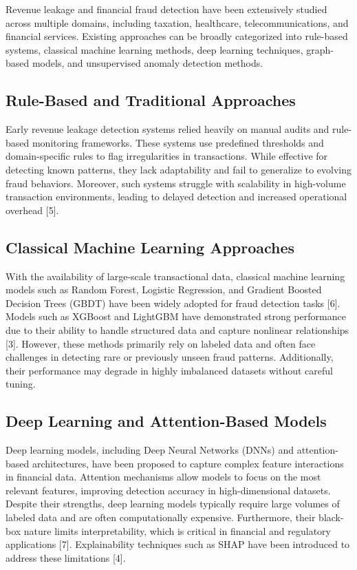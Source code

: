 \documentclass[conference]{IEEEtran}
\begin{document}
Revenue leakage and financial fraud detection have been extensively studied across multiple domains, including taxation, healthcare, telecommunications, and financial services. Existing approaches can be broadly categorized into rule-based systems, classical machine learning methods, deep learning techniques, graph-based models, and unsupervised anomaly detection methods.

\subsection{Rule-Based and Traditional Approaches}
Early revenue leakage detection systems relied heavily on manual audits and rule-based monitoring frameworks. These systems use predefined thresholds and domain-specific rules to flag irregularities in transactions. While effective for detecting known patterns, they lack adaptability and fail to generalize to evolving fraud behaviors. Moreover, such systems struggle with scalability in high-volume transaction environments, leading to delayed detection and increased operational overhead [5].

\subsection{Classical Machine Learning Approaches}
With the availability of large-scale transactional data, classical machine learning models such as Random Forest, Logistic Regression, and Gradient Boosted Decision Trees (GBDT) have been widely adopted for fraud detection tasks [6]. Models such as XGBoost and LightGBM have demonstrated strong performance due to their ability to handle structured data and capture nonlinear relationships [3]. However, these methods primarily rely on labeled data and often face challenges in detecting rare or previously unseen fraud patterns. Additionally, their performance may degrade in highly imbalanced datasets without careful tuning.

\subsection{Deep Learning and Attention-Based Models}
Deep learning models, including Deep Neural Networks (DNNs) and attention-based architectures, have been proposed to capture complex feature interactions in financial data. Attention mechanisms allow models to focus on the most relevant features, improving detection accuracy in high-dimensional datasets. Despite their strengths, deep learning models typically require large volumes of labeled data and are often computationally expensive. Furthermore, their black-box nature limits interpretability, which is critical in financial and regulatory applications [7]. Explainability techniques such as SHAP have been introduced to address these limitations [4].
\end{document}

